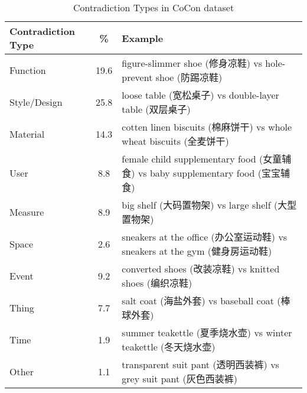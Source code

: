 \begin{table}[h!]
	\small
	\centering
	\begin{tabular}{m{1.5cm}|c|m{5cm}}
		Contradiction Type & \% & Example \\
		\hline
		Function & 19.6 & figure-slimmer shoe (修身凉鞋) vs hole-prevent shoe (防踢凉鞋) \\
		Style/Design & 25.8 & loose table (宽松桌子) vs double-layer table (双层桌子) \\
		Material & 14.3 & cotten linen biscuits (棉麻饼干) vs whole wheat biscuits (全麦饼干) \\
		User & 8.8 & female child supplementary food (女童辅食) vs baby supplementary food (宝宝辅食)  \\
		Measure & 8.9 & big shelf (大码置物架) vs large shelf (大型置物架) \\
		Space & 2.6 & sneakers at the office (办公室运动鞋) vs sneakers at the gym (健身房运动鞋) \\
		Event & 9.2 & converted shoes (改装凉鞋) vs knitted shoes (编织凉鞋) \\
		Thing & 7.7 & salt coat (海盐外套) vs baseball coat (棒球外套) \\
		Time & 1.9 & summer teakettle (夏季烧水壶) vs winter teakettle (冬天烧水壶) \\
		Other & 1.1 & transparent suit pant (透明西装裤) vs grey suit pant (灰色西装裤) 
	\end{tabular}
	\caption{Contradiction Types in CoCon dataset}
	\label{tab:contradictionType}	
\end{table}



